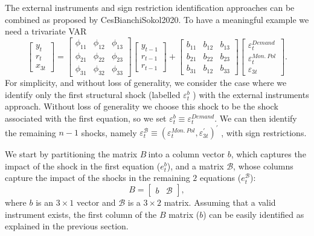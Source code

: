 \documentclass[10pt]{article}
\begin{document}
The external instruments and sign restriction identification approaches can
be combined as proposed by CesBianchiSokol2020. To have a meaningful example
we need a trivariate VAR%
\begin{equation}
\left[
\begin{array}{c}
y_{t} \\
r_{t} \\
x_{3t}%
\end{array}%
\right] =%
\begin{bmatrix}
\phi _{11} & \phi _{12} & \phi _{13} \\
\phi _{21} & \phi _{22} & \phi _{23} \\
\phi _{31} & \phi _{32} & \phi _{33}%
\end{bmatrix}%
\left[
\begin{array}{c}
y_{t-1} \\
r_{t-1} \\
r_{t-1}%
\end{array}%
\right] +\left[
\begin{array}{ccc}
b_{11} & b_{12} & b_{13} \\
b_{21} & b_{22} & b_{23} \\
b_{31} & b_{12} & b_{33}%
\end{array}%
\right]
\begin{bmatrix}
\varepsilon _{t}^{Demand} \\
\varepsilon _{t}^{Mon.\ Pol} \\
\varepsilon _{3t}%
\end{bmatrix}%
.  \label{eq:struct_var_sriv}
\end{equation}%
For simplicity, and without loss of generality, we consider the case where
we identify only the first structural shock (labelled $\varepsilon _{t}^{b}$%
) with the external instruments approach. Without loss of generality we
choose this shock to be the shock associated with the first equation, so we
set $\varepsilon _{t}^{b}\equiv \varepsilon _{t}^{Demand}$. We can then
identify the remaining $n-1$ shocks, namely $\varepsilon _{t}^{\mathcal{B}%
}\equiv (\varepsilon _{t}^{Mon.\ Pol},\varepsilon _{3t}^{\prime })^{\prime }$%
, with sign restrictions.

We start by partitioning the matrix $B\ $into a column vector $b$, which
captures the impact of the shock in the first equation ($e_{t}^{b}$), and a
matrix $\mathcal{B}$, whose columns capture the impact of the shocks in the
remaining $2$ equations ($e_{t}^{\mathcal{B}}$):%
\begin{equation}
B=\left[
\begin{array}{cc}
b & \mathcal{B}%
\end{array}%
\right] ,  \label{eq:B_partitioned}
\end{equation}%
where $b$ is an $3\times 1$ vector and $\mathcal{B}$ is a $3\times 2$
matrix. Assuming that a valid instrument exists, the first column of the $B$
matrix ($b$) can be easily identified as explained in the previous section.
\end{document}
